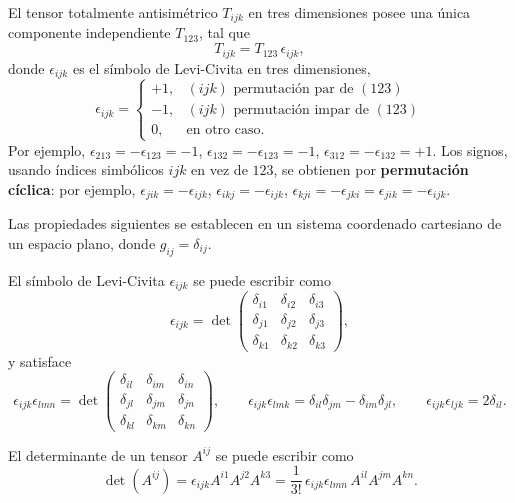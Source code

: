 \begin{ejemplo}[Caso $n=3$]
El tensor totalmente antisimétrico $T_{ijk}$ en tres dimensiones posee
una única componente independiente $T_{123}$, tal que
\[
T_{ijk} = T_{123}\, \epsilon_{ijk},
\]
donde $\epsilon_{ijk}$ es el símbolo de Levi-Civita en tres dimensiones,
\[
\epsilon_{ijk} = \begin{cases} +1, & (ijk) \text{ permutación par de }
(123) \\ -1, & (ijk) \text{ permutación impar de } (123) \\ 0, & \text{en
otro caso.} \end{cases}
\]
Por ejemplo, $\epsilon_{213}=-\epsilon_{123}=-1$,
$\epsilon_{132}=-\epsilon_{123}=-1$, $\epsilon_{312} =
-\epsilon_{132}=+1$. Los signos, usando índices simbólicos $ijk$ en vez
de $123$, se obtienen por \textbf{permutación cíclica}: por ejemplo,
$\epsilon_{jik}=-\epsilon_{ijk}$, $\epsilon_{ikj}=-\epsilon_{ijk}$,
$\epsilon_{kji} = -\epsilon_{jki} = \epsilon_{jik}=-\epsilon_{ijk}$.
\end{ejemplo}

Las propiedades siguientes se establecen en un sistema coordenado
cartesiano de un espacio plano, donde $g_{ij}=\delta_{ij}$.

\begin{proposicionc}
El símbolo de Levi-Civita $\epsilon_{ijk}$ se puede escribir como
\[
\epsilon_{ijk} = \det\begin{pmatrix} \delta_{i1} & \delta_{i2} &
\delta_{i3} \\ \delta_{j1} & \delta_{j2} & \delta_{j3} \\ \delta_{k1} &
\delta_{k2} & \delta_{k3} \end{pmatrix},
\]
y satisface
\[
\epsilon_{ijk}\epsilon_{lmn} = \det\begin{pmatrix} \delta_{il} &
\delta_{im} & \delta_{in} \\ \delta_{jl} & \delta_{jm} & \delta_{jn} \\
\delta_{kl} & \delta_{km} & \delta_{kn} \end{pmatrix}, \qquad
\epsilon_{ijk}\epsilon_{lmk} = \delta_{il}\delta_{jm} -
\delta_{im}\delta_{jl}, \qquad \epsilon_{ijk}\epsilon_{ljk} =
2\delta_{il} .
\]
\end{proposicionc}

\begin{proposicionc}
El determinante de un tensor $A^{ij}$ se puede escribir como
\[
\det(A^{ij}) = \epsilon_{ijk}A^{i1}A^{j2}A^{k3} = \frac{1}{3!}\,
\epsilon_{ijk}\epsilon_{lmn}\, A^{il}A^{jm}A^{kn} .
\]
\end{proposicionc}

